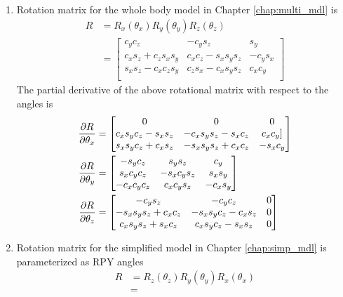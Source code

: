 \begin{enumerate}
\item Rotation matrix for the whole body model in Chapter \ref{chap:multi_mdl} is 
\begin{equation}
	\label{eq:rot_full}
	\begin{split}
	R &= R_x(\theta_x) R_y(\theta_y) R_z(\theta_z) \\
	&= 
	\begin{bmatrix}
		c_yc_z &-c_ys_z &s_y \\
		c_xs_z+c_zs_xs_y &c_xc_z-s_xs_ys_z &-c_ys_x \\
  		s_xs_z-c_xc_zs_y &c_zs_x-c_xs_ys_z & c_xc_y \\
	\end{bmatrix}
	\end{split}
\end{equation}
The partial derivative of the above rotational matrix with respect to the angles is
\begin{equation}
	\begin{split}
	\frac{\partial {R}}{\partial {\theta_x}} &=
	\begin{bmatrix} 
		0 &0 &0 \\
        c_xs_yc_z-s_xs_z &-c_xs_ys_z-s_xc_z &c_xc_y]\\
        s_xs_yc_z+c_xs_z &-s_xs_ys_z+c_xc_z &-s_xc_y
	\end{bmatrix}\\
	\frac{\partial {R}}{\partial {\theta_y}}&=
	\begin{bmatrix}
    -s_yc_z &s_ys_z &c_y \\
     s_xc_yc_z &-s_xc_ys_z & s_xs_y \\
    -c_xc_yc_z & c_xc_ys_z &-c_xs_y
	\end{bmatrix}\\
	\frac{\partial {R}}{\partial {\theta_z}}&=
	\begin{bmatrix}
    -c_ys_z &-c_yc_z &0 \\
    -s_xs_ys_z+c_xc_z &-s_xs_yc_z-c_xs_z &0 \\
     c_xs_ys_z+s_xc_z &c_xs_yc_z-s_xs_z &0
	\end{bmatrix}
	\end{split}
\end{equation}
\item Rotation matrix for the simplified model in Chapter \ref{chap:simp_mdl} is parameterized as RPY angles
\begin{equation}
	\label{eq:rot_simp}
	\begin{split}
		R &= R_z(\theta_z) R_y(\theta_y) R_x(\theta_x)\\ &=

\end{split}
\end{equation}
\end{enumerate}
